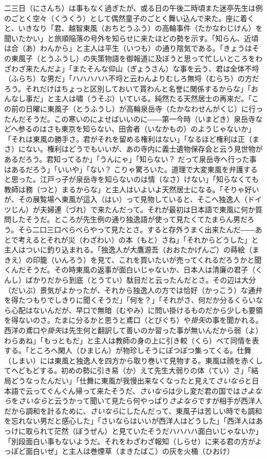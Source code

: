 \documentclass{book}
\begin{document}
二三日（にさんち）は事もなく過ぎたが、或る日の午後二時頃また迷亭先生は例のごとく空々（くうくう）として偶然童子のごとく舞い込んで来た。座に着くと、いきなり「君、越智東風（おちとうふう）の高輪事件（たかなわじけん）を聞いたかい」と旅順陥落の号外を知らせに来たほどの勢を示す。「知らん、近頃は合（あ）わんから」と主人は平生（いつも）の通り陰気である。「きょうはその東風子（とうふうし）の失策物語を御報道に及ぼうと思って忙しいところをわざわざ来たんだよ」「またそんな仰山（ぎょうさん）な事を云う、君は全体不埒（ふらち）な男だ」「ハハハハハ不埒と云わんよりむしろ無埒（むらち）の方だろう。それだけはちょっと区別しておいて貰わんと名誉に関係するからな」「おんなし事だ」と主人は嘯（うそぶ）いている。純然たる天然居士の再来だ。「この前の日曜に東風子（とうふうし）が高輪泉岳寺（たかなわせんがくじ）に行ったんだそうだ。この寒いのによせばいいのに――第一今時（いまどき）泉岳寺などへ参るのはさも東京を知らない、田舎者（いなかもの）のようじゃないか」「それは東風の勝手さ。君がそれを留める権利はない」「なるほど権利は正（まさ）にない。権利はどうでもいいが、あの寺内に義士遺物保存会と云う見世物があるだろう。君知ってるか」「うんにゃ」「知らない？ だって泉岳寺へ行った事はあるだろう」「いいや」「ない？ こりゃ驚ろいた。道理で大変東風を弁護すると思った。江戸っ子が泉岳寺を知らないのは情（なさ）けない」「知らなくても教師は務（つと）まるからな」と主人はいよいよ天然居士になる。「そりゃ好いが、その展覧場へ東風が這入（はい）って見物していると、そこへ独逸人（ドイツじん）が夫婦連（づれ）で来たんだって。それが最初は日本語で東風に何か質問したそうだ。ところが先生例の通り独逸語が使って見たくてたまらん男だろう。そら二口三口べらべらやって見たとさ。すると存外うまく出来たんだ――あとで考えるとそれが災（わざわい）の本（もと）さね」「それからどうした」と主人はついに釣り込まれる。「独逸人が大鷹源吾（おおたかげんご）の蒔絵（まきえ）の印籠（いんろう）を見て、これを買いたいが売ってくれるだろうかと聞くんだそうだ。その時東風の返事が面白いじゃないか、日本人は清廉の君子（くんし）ばかりだから到底（とうてい）駄目だと云ったんだとさ。その辺は大分（だいぶ）景気がよかったが、それから独逸人の方では恰好（かっこう）な通弁を得たつもりでしきりに聞くそうだ」「何を？」「それがさ、何だか分るくらいなら心配はないんだが、早口で無暗（むやみ）に問い掛けるものだから少しも要領を得ないのさ。たまに分るかと思うと鳶口（とびぐち）や\emph{掛矢}の事を聞かれる。西洋の鳶口や\emph{掛矢}は先生何と翻訳して善いのか習った事が無いんだから弱（よ）わらあね」「もっともだ」と主人は教師の身の上に引き較（くら）べて同情を表する。「ところへ閑人（ひまじん）が物珍しそうにぽつぽつ集ってくる。仕舞（しまい）には東風と独逸人を四方から取り巻いて見物する。東風は顔を赤くしてへどもどする。初めの勢に引き易（か）えて先生大弱りの体（てい）さ」「結局どうなったんだい」「仕舞に東風が我慢出来なくなったと見えて\emph{さいなら}と日本語で云ってぐんぐん帰って来たそうだ、\emph{さいなら}は少し変だ君の国では\emph{さよなら}を\emph{さいなら}と云うかって聞いて見たら何やっぱり\emph{さよなら}ですが相手が西洋人だから調和を計るために、\emph{さいなら}にしたんだって、東風子は苦しい時でも調和を忘れない男だと感心した」「さいならはいいが西洋人はどうした」「西洋人はあっけに取られて茫然（ぼうぜん）と見ていたそうだハハハハ面白いじゃないか」「別段面白い事もないようだ。それをわざわざ報知（しらせ）に来る君の方がよっぽど面白いぜ」と主人は巻煙草（まきたばこ）の灰を火桶（ひおけ）
\end{document}
